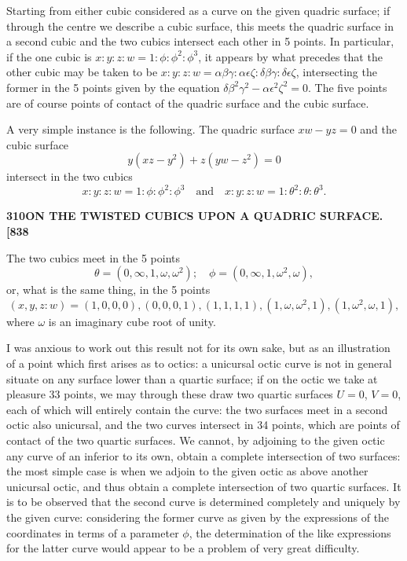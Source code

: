 \documentclass[11pt,a4paper]{book}
\begin{document}
Starting from either cubic considered as a curve on the given quadric surface; if through the centre we describe a cubic surface, this meets the quadric surface in a second cubic and the two cubics intersect each other in 5 points. In particular, if the one cubic is $x : y : z : w = 1 : \phi : \phi^2 : \phi^3$, it appears by what precedes that the other cubic may be taken to be $x : y : z : w = \alpha\beta\gamma : \alpha\epsilon\zeta : \delta\beta\gamma : \delta\epsilon\zeta$, intersecting the former in the 5 points given by the equation $\delta\beta^2\gamma^2 - \alpha\epsilon^2\zeta^2 = 0$. The five points are of course points of contact of the quadric surface and the cubic surface.

A very simple instance is the following. The quadric surface $xw - yz = 0$ and the cubic surface
\[
y(xz - y^2) + z(yw - z^2) = 0
\]
intersect in the two cubics
\[
x : y : z : w = 1 : \phi : \phi^2 : \phi^3 \quad \text{and} \quad x : y : z : w = 1 : \theta^2 : \theta : \theta^3.
\]

\newpage
\setcounter{page}{310}

\noindent\textbf{310}\hfill\textbf{ON THE TWISTED CUBICS UPON A QUADRIC SURFACE.}\hfill\textbf{[838}

\bigskip

\noindent The two cubics meet in the 5 points
\[
\theta = (0, \infty, 1, \omega, \omega^2); \quad \phi = (0, \infty, 1, \omega^2, \omega),
\]
or, what is the same thing, in the 5 points
\[
(x, y, z : w) = (1, 0, 0, 0), (0, 0, 0, 1), (1, 1, 1, 1), (1, \omega, \omega^2, 1), (1, \omega^2, \omega, 1),
\]
where $\omega$ is an imaginary cube root of unity.

I was anxious to work out this result not for its own sake, but as an illustration of a point which first arises as to octics: a unicursal octic curve is not in general situate on any surface lower than a quartic surface; if on the octic we take at pleasure 33 points, we may through these draw two quartic surfaces $U = 0$, $V = 0$, each of which will entirely contain the curve: the two surfaces meet in a second octic also unicursal, and the two curves intersect in 34 points, which are points of contact of the two quartic surfaces. We cannot, by adjoining to the given octic any curve of an inferior to its own, obtain a complete intersection of two surfaces: the most simple case is when we adjoin to the given octic as above another unicursal octic, and thus obtain a complete intersection of two quartic surfaces. It is to be observed that the second curve is determined completely and uniquely by the given curve: considering the former curve as given by the expressions of the coordinates in terms of a parameter $\phi$, the determination of the like expressions for the latter curve would appear to be a problem of very great difficulty.
\end{document}
